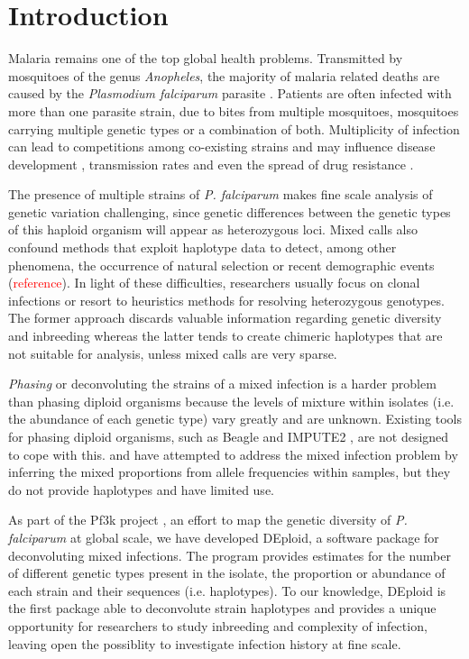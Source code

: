 \documentclass{bioinfo}
\begin{document}
\maketitle

\section{Introduction}
Malaria remains one of the top global health problems. Transmitted by mosquitoes of the genus {\it Anopheles}, the majority of malaria related deaths are caused by the {\it Plasmodium falciparum} parasite \citep{WHO2016}. Patients are often infected with  more than one parasite strain, due to bites from multiple mosquitoes, mosquitoes carrying multiple genetic types or a combination of both. Multiplicity of infection  can lead to competitions among co-existing strains and may influence disease development \citep{deRoode2005}, transmission rates \citep{Arnot1998} and even the spread of drug resistance \citep{deRoode2004}.

The presence of multiple strains of {\it P. falciparum} makes fine scale analysis of genetic variation challenging, since genetic differences between the genetic types of this haploid organism will appear as heterozygous loci. Mixed calls also confound methods that exploit haplotype data to detect, among other phenomena, the occurrence of natural selection or recent demographic events (\textcolor{red}{reference}). In light of these difficulties, researchers usually focus on clonal infections or resort to heuristics methods for resolving heterozygous genotypes. The former approach discards valuable information regarding genetic diversity and inbreeding whereas the latter tends to create chimeric haplotypes that are not suitable for analysis, unless mixed calls are very sparse.

{\it Phasing} or deconvoluting the strains of a mixed infection is a harder problem than phasing diploid organisms because the levels of mixture within isolates (i.e. the abundance of each genetic type) vary greatly and are unknown.  Existing tools for phasing diploid organisms, such as Beagle \citep{Browning2007} and IMPUTE2 \citep{Howie2009}, are not designed to cope with this. \citet{Galinsky2015} and \citet{Jack2016} have attempted to address the mixed infection problem by inferring the mixed proportions from allele frequencies within samples, but they do not provide haplotypes and have limited use.

As part of the Pf3k project \citep{Pf3k2016}, an effort to map the genetic diversity of {\it P. falciparum} at global scale, we have developed {\textmd DEploid}, a software package for deconvoluting mixed infections. The program provides estimates for the number of different genetic types present in the isolate, the proportion or abundance of each strain and their sequences (i.e. haplotypes). To our knowledge, DEploid is the first package able to deconvolute strain haplotypes and provides a unique opportunity for researchers to study inbreeding and complexity of infection, leaving open the possiblity to investigate infection history at fine scale.
\end{document}
